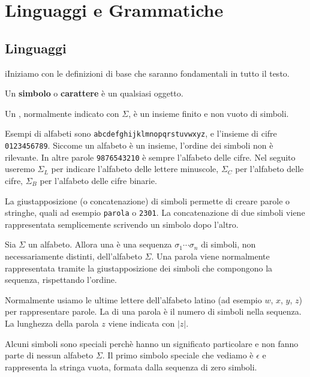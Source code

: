 \chapter{Linguaggi e Grammatiche}\label{cha:linguaggi+grammatiche}

\section{Linguaggi}
iIniziamo con le definizioni di base che saranno fondamentali in tutto il testo.

Un \textbf{simbolo} o \textbf{carattere} è un qualsiasi oggetto.


\begin{definition}[Alfabeto]\label{def:alfabeto}
Un , normalmente indicato con $\Sigma$, è un insieme finito e non vuoto di simboli.
\end{definition}

Esempi di alfabeti sono \texttt{abcdefghijklmnopqrstuvwxyz}, e l'insieme di cifre \texttt{0123456789}.
Siccome un alfabeto è un insieme, l'ordine dei simboli non è rilevante.
In altre parole \texttt{9876543210} è sempre l'alfabeto delle cifre.
Nel seguito useremo $\Sigma_{L}$ per indicare l'alfabeto delle lettere minuscole, $\Sigma_{C}$ per l'alfabeto delle cifre,
$\Sigma_{B}$ per l'alfabeto delle cifre binarie.


La giustapposizione (o concatenazione) di simboli permette di creare parole o stringhe, quali ad
esempio \texttt{parola} o \texttt{2301}.
La concatenazione di due simboli viene rappresentata semplicemente scrivendo un simbolo dopo l'altro.


\begin{definition}[Parola]\label{def:parola}
Sia $\Sigma$ un alfabeto.
Allora una  è una sequenza $\sigma_{1}\cdots\sigma_{n}$ di simboli, non necessariamente
distinti, dell'alfabeto $\Sigma$.
Una parola viene normalmente rappresentata tramite la giustapposizione dei
simboli che compongono la sequenza, rispettando l'ordine.
\end{definition}

Normalmente usiamo le ultime lettere dell'alfabeto latino (ad esempio $w$, $x$,
$y$, $z$) per rappresentare parole.
La  di una parola è il numero di simboli nella sequenza.
La lunghezza della parola $z$ viene indicata con $|z|$.

Alcuni simboli sono speciali perchè hanno un significato particolare e non fanno parte di nessun alfabeto $\Sigma$.
Il primo simbolo speciale che vediamo è $\epsilon$ e rappresenta la stringa vuota,
formata dalla sequenza di zero simboli.

